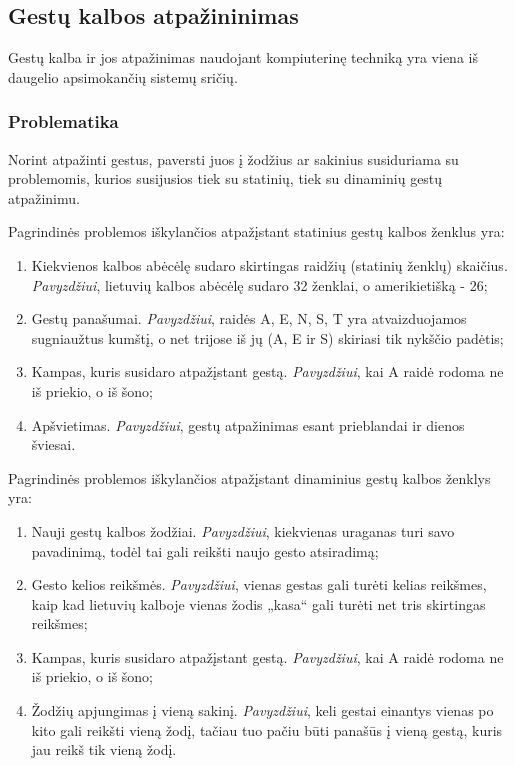 \documentclass{VUMIFInfKursinis}
\begin{document}
\subsection{Gestų kalbos atpažininimas}
Gestų kalba ir jos atpažinimas naudojant kompiuterinę techniką yra viena iš daugelio apsimokančių sistemų sričių. 

\subsubsection{Problematika}
Norint atpažinti gestus, paversti juos į žodžius ar sakinius susiduriama su problemomis, kurios susijusios tiek su statinių, tiek su dinaminių gestų atpažinimu.

Pagrindinės problemos iškylančios atpažįstant statinius gestų kalbos ženklus yra:
\begin{enumerate}
	\item Kiekvienos kalbos abėcėlę sudaro skirtingas raidžių (statinių ženklų) skaičius. \textit{Pavyzdžiui}, lietuvių kalbos abėcėlę sudaro 32 ženklai, o amerikietišką - 26; 
	\item Gestų panašumai. \textit{Pavyzdžiui}, raidės A, E, N, S, T yra atvaizduojamos sugniaužtus kumštį, o net trijose iš jų (A, E ir S) skiriasi tik nykščio padėtis;
	\item Kampas, kuris susidaro atpažįstant gestą. \textit{Pavyzdžiui}, kai A raidė rodoma ne iš priekio, o iš šono;
	\item Apšvietimas. \textit{Pavyzdžiui}, gestų atpažinimas esant prieblandai ir dienos šviesai.
\end{enumerate}

Pagrindinės problemos iškylančios atpažįstant dinaminius gestų kalbos ženklys yra:
\begin{enumerate}
	\item Nauji gestų kalbos žodžiai. \textit{Pavyzdžiui}, kiekvienas uraganas turi savo pavadinimą, todėl tai gali reikšti naujo gesto atsiradimą; 
	\item Gesto kelios reikšmės. \textit{Pavyzdžiui}, vienas gestas gali turėti kelias reikšmes, kaip kad lietuvių kalboje vienas žodis „kasa“ gali turėti net tris skirtingas reikšmes;
	\item Kampas, kuris susidaro atpažįstant gestą. \textit{Pavyzdžiui}, kai A raidė rodoma ne iš priekio, o iš šono;
	\item Žodžių apjungimas į vieną sakinį. \textit{Pavyzdžiui}, keli gestai einantys vienas po kito gali reikšti vieną žodį, tačiau tuo pačiu būti panašūs į vieną gestą, kuris jau reikš tik vieną žodį.
\end{enumerate}
\end{document}
